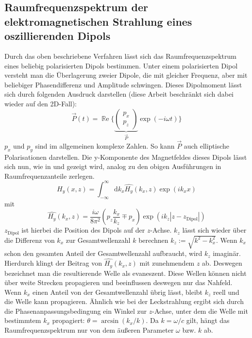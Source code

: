 \documentclass[a4paper, titlepage,  ngerman, fullpage]{book}
\renewcommand{\Re}{\operatorname{\mathbb{R}e}}
\begin{document}
	\subsection{Raumfrequenzspektrum der elektromagnetischen Strahlung eines oszillierenden Dipols}
	\label{sec:spatial_freq_dip}
	Durch das oben beschriebene Verfahren lässt sich das Raumfrequenzspektrum eines beliebig polarisierten Dipols bestimmen. Unter einem polarisierten Dipol versteht man die Überlagerung zweier Dipole, die mit gleicher Frequenz, aber mit beliebiger Phasendifferenz und Amplitude schwingen. Dieses Dipolmoment lässt sich durch folgenden Ausdruck darstellen (diese Arbeit beschränkt sich dabei wieder auf den 2D-Fall): 
	$$\vec{P}(t)= \Re\biggl\{\underbrace{\begin{pmatrix} p_x \\ p_z \end{pmatrix}}_{\vec{P}} \exp(-i\omega t)\biggr\} $$
	$p_x$ und $p_y$ sind im allgemeinen komplexe Zahlen. So kann $\vec{P}$ auch elliptische Polarisationen darstellen. Die y-Komponente des Magnetfeldes dieses Dipols lässt sich nun, wie in \cite{Novotny.2012b} und \cite{RodriguezFortuno.2013} gezeigt wird, analog zu den obigen Ausführungen in Raumfrequenzanteile zerlegen.
	\begin{equation}
		H_y(x, z) = \int_{-\infty}^{\infty}\mathrm{d}k_x\hat{H_y}(k_x, z)\exp(ik _xx) 
	\end{equation}
	mit
	\begin{equation}
		\label{eq:spatial_freq_dip}
		\boxed{\hat{H_y}(k_x, z) = \dfrac{i\omega}{8\pi^2}\left(p_z\dfrac{k_x}{k_z} \mp p_x\right)\exp(ik_z|z-z_{\mathrm{Dipol}}|)}
	\end{equation}
	$z_{\mathrm{Dipol}}$ ist hierbei die Position des Dipols auf der $z$-Achse. $k_z$ lässt sich wieder über die Differenz von $k_x$ zur Gesamtwellenzahl $k$ berechnen $k_z := \sqrt{k^2-k_x^2}$. Wenn $k_x$ schon den gesamten Anteil der Gesamtwellenzahl aufbraucht,  wird $k_z$ imaginär. Hierdurch klingt der Beitrag von $\hat{H_y}(k_x, z)$ mit zunehmendem $z$ ab. Deswegen bezeichnet man die resultierende Welle als evaneszent. Diese Wellen können nicht über weite Strecken propagieren und beeinflussen deswegen nur das Nahfeld. Wenn $k_x$ einen Anteil von der Gesamtwellenzahl übrig lässt, bleibt $k_z$ reell und die Welle kann propagieren. Ähnlich wie bei der Leckstrahlung ergibt sich durch die Phasenanpassungsbedingung ein Winkel zur $z$-Achse, unter dem die Welle mit bestimmtem $k_x$ propagiert: $\theta = \arcsin(k_x/k)$. Da $k = \omega / c$ gilt, hängt das Raumfrequenzspektrum nur von dem äußeren Parameter $\omega$ bzw. $k$ ab. 
\end{document}
